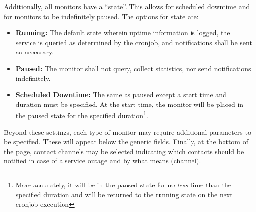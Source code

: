 \documentclass[10pt]{article}
\begin{document}
Additionally, all monitors have a ``state''.  This allows for scheduled downtime and for monitors to be indefinitely
paused.  The options for state are:

\begin{itemize}
    \item \textbf{Running:} The default state wherein uptime information is logged, the service is queried as determined
    by the cronjob, and notifications shall be sent as necessary.
    \item \textbf{Paused:} The monitor shall not query, collect statistics, nor send notifications indefinitely.
    \item \textbf{Scheduled Downtime:} The same as paused except a start time and duration must be specified.  At the start
    time, the monitor will be placed in the paused state for the specified duration\footnote{More accurately, it will be
    in the paused state for no \emph{less} time than the specified duration and will be returned to the running state on
    the next cronjob execution}.
\end{itemize}

Beyond these settings, each type of monitor may require additional parameters to be specified.  These will appear below
the generic fields.  Finally, at the bottom of the page, contact channels may be selected indicating which contacts
should be notified in case of a service outage and by what means (channel).
\end{document}
